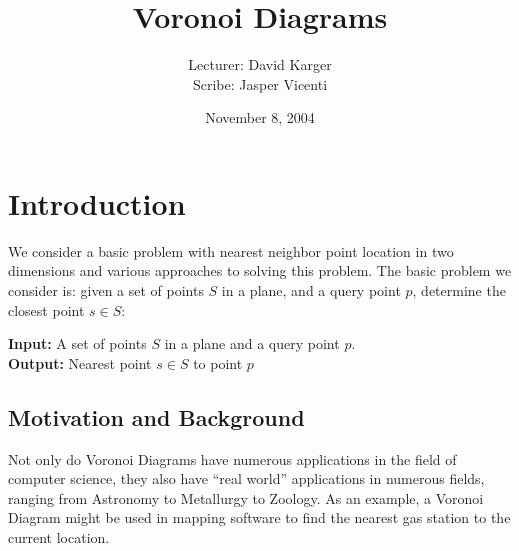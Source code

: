 \documentclass{article}
\title{Voronoi Diagrams}
\date{November 8, 2004}
\author{Lecturer: David Karger\\ Scribe: Jasper Vicenti}
\begin{document}
%
%
%
%

%



\section{Introduction}

We consider a basic problem with nearest neighbor point location in
two dimensions and various
approaches to solving this problem. The basic problem we consider is:
given a set of points $S$ in a plane, and a query point $p$, determine 
the closest point $s \in S$:

{\bf Input:} A set of points $S$ in a plane and a query point $p$.\\
{\bf Output:} Nearest point $s \in S$ to point $p$

\subsection{Motivation and Background}
Not only do Voronoi Diagrams have numerous applications in the field
of computer science, they also have ``real world'' applications in numerous
fields, ranging from Astronomy to Metallurgy to Zoology. As an example, 
a Voronoi Diagram might be used in mapping software to find the nearest gas station to 
the current location.
\end{document}

